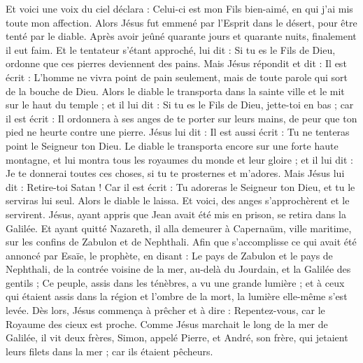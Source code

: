 \begin{multicols}{2}
Et voici une voix du ciel déclara : Celui-ci est mon Fils bien-aimé, en qui j'ai mis toute mon affection.
\VerseOne{}Alors Jésus fut emmené par l'Esprit dans le désert, pour être tenté par le diable.
Après avoir jeûné quarante jours et quarante nuits, finalement il eut faim.
Et le tentateur s’étant approché, lui dit : Si tu es le Fils de Dieu, ordonne que ces pierres deviennent des pains.
Mais Jésus répondit et dit : Il est écrit : L'homme ne vivra point de pain seulement, mais de toute parole qui sort de la bouche de Dieu.
Alors le diable le transporta dans la sainte ville et le mit sur le haut du temple ;
et il lui dit : Si tu es le Fils de Dieu, jette-toi en bas ; car il est écrit : Il ordonnera à ses anges de te porter sur leurs mains, de peur que ton pied ne heurte contre une pierre.
Jésus lui dit : Il est aussi écrit : Tu ne tenteras point le Seigneur ton Dieu.
Le diable le transporta encore sur une forte haute montagne, et lui montra tous les royaumes du monde et leur gloire ;
et il lui dit : Je te donnerai toutes ces choses, si tu te prosternes et m'adores.
Mais Jésus lui dit : Retire-toi Satan ! Car il est écrit : Tu adoreras le Seigneur ton Dieu, et tu le serviras lui seul.
Alors le diable le laissa. Et voici, des anges s'approchèrent et le servirent.
Jésus, ayant appris que Jean avait été mis en prison, se retira dans la Galilée.
Et ayant quitté Nazareth, il alla demeurer à Capernaüm, ville maritime, sur les confins de Zabulon et de Nephthali.
Afin que s’accomplisse ce qui avait été annoncé par Esaïe, le prophète, en disant :
Le pays de Zabulon et le pays de Nephthali, de la contrée voisine de la mer, au-delà du Jourdain, et la Galilée des gentils ;
Ce peuple, assis dans les ténèbres, a vu une grande lumière ; et à ceux qui étaient assis dans la région et l'ombre de la mort, la lumière elle-même s'est levée.
Dès lors, Jésus commença à prêcher et à dire : Repentez-vous, car le Royaume des cieux est proche.
Comme Jésus marchait le long de la mer de Galilée, il vit deux frères, Simon, appelé Pierre, et André, son frère, qui jetaient leurs filets dans la mer ; car ils étaient pêcheurs.

\end{multicols}
